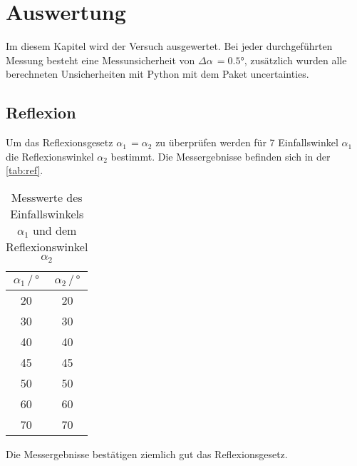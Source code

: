 \newpage
\section{Auswertung}
Im diesem Kapitel wird der Versuch ausgewertet. Bei jeder durchgeführten Messung besteht eine Messunsicherheit von $\Delta \alpha \, = 0.5 °$, zusätzlich wurden alle 
berechneten Unsicherheiten mit Python mit dem Paket uncertainties\cite{uncertainties}.

\subsection{Reflexion}
Um das Reflexionsgesetz $\alpha_1 \, = \alpha_2$ zu überprüfen werden für 7 Einfallswinkel $\alpha_1$ die Reflexionswinkel $\alpha_2$ bestimmt.
Die Messergebnisse befinden sich in der \autoref{tab:ref}. 

\begin{table}
    \centering
    \caption{Messwerte des Einfallswinkels $\alpha_1$ und dem Reflexionswinkel $\alpha_2$}
    \label{tab:ref}
    \begin{tabular}{c c}
    \toprule
         $\alpha_1 \, / \, ° $ & $\alpha_2 \, / \, ° $\\
    \midrule 
    20 & 20\\
    30 & 30\\
    40 & 40\\
    45 & 45\\
    50 & 50\\
    60 & 60\\
    70 & 70\\
    \bottomrule
    \end{tabular}
\end{table}

\noindent
Die Messergebnisse bestätigen ziemlich gut das Reflexionsgesetz.


